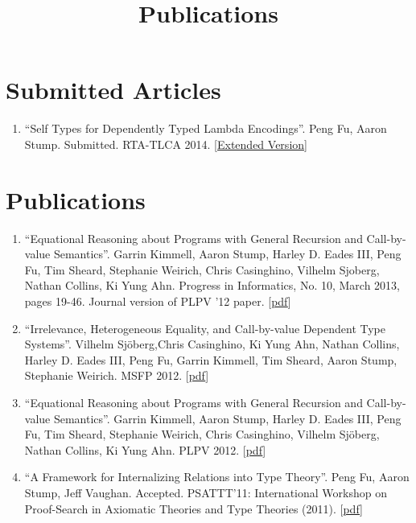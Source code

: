 \documentclass[10pt]{article}
\title{\bfseries\Large Publications}
\date{}
\begin{document}
\maketitle
\vspace{-4em}

\vspace{20pt}



\section*{Submitted Articles}

\begin{enumerate}
\item ``Self Types for Dependently Typed Lambda Encodings''. Peng Fu, Aaron Stump. Submitted. RTA-TLCA 2014. [\href{../../document/papers/rta-tlca.pdf}{Extended Version}]

\end{enumerate}

\section*{Publications}

\begin{enumerate}
\item ``Equational Reasoning about Programs with General Recursion and Call-by-value Semantics''. Garrin Kimmell, Aaron Stump, Harley D. Eades III, Peng Fu, Tim Sheard, Stephanie Weirich, Chris Casinghino, Vilhelm Sjoberg, Nathan Collins, Ki Yung Ahn. Progress in Informatics, No. 10, March 2013, pages 19-46. Journal version of PLPV '12 paper. [\href{../../document/papers/pi13.pdf}{pdf}] 
\item ``Irrelevance, Heterogeneous Equality, and Call-by-value Dependent Type Systems''. Vilhelm Sj\"oberg,Chris Casinghino, Ki Yung Ahn, Nathan Collins, Harley D. Eades III, Peng Fu, Garrin Kimmell, Tim Sheard, Aaron Stump, Stephanie Weirich. MSFP 2012. [\href{../../document/papers/msfp12.pdf}{pdf}] 
\item ``Equational Reasoning about Programs with General Recursion and Call-by-value Semantics''. Garrin Kimmell, Aaron Stump, Harley D. Eades III, Peng Fu, Tim Sheard, Stephanie Weirich, Chris Casinghino, Vilhelm Sj\"oberg, Nathan Collins, Ki Yung Ahn. PLPV 2012. [\href{../../document/papers/plpv12.pdf}{pdf}] 

\item ``A Framework for Internalizing Relations into Type Theory''. Peng Fu, Aaron Stump, Jeff Vaughan. Accepted. PSATTT'11: International Workshop on Proof-Search in Axiomatic Theories and Type Theories (2011). [\href{../../document/papers/psattt-paper.pdf}{pdf}]
  
\end{enumerate}
\end{document}

